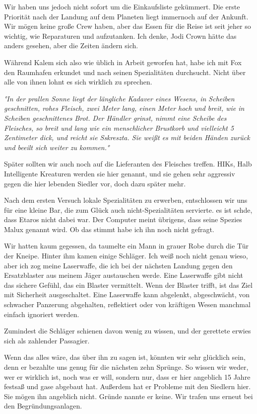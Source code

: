 \documentclass[11pt]{article}
\begin{document}
Wir haben uns jedoch nicht sofort um die Einkaufsliste gekümmert. Die
erste Priorität nach der Landung auf dem Planeten liegt immernoch auf
der Ankunft. Wir mögen keine große Crew haben, aber das Essen für die
Reise ist seit jeher so wichtig, wie Reparaturen und aufzutanken. Ich
denke, Jodi Crown hätte das anders gesehen, aber die Zeiten ändern sich.

Während Kalem sich also wie üblich in Arbeit geworfen hat, habe ich mit
Fox den Raumhafen erkundet und nach seinen Spezialitäten durchsucht.
Nicht über alle von ihnen lohnt es sich wirklich zu sprechen.

\emph{°In der prallen Sonne liegt der längliche Kadaver eines Wesens, in
Scheiben geschnitten, rohes Fleisch, zwei Meter lang, einen Meter hoch
und breit, wie in Scheiben geschnittenes Brot. Der Händler grinst, nimmt
eine Scheibe des Fleisches, so breit und lang wie ein menschlicher
Brustkorb und vielleicht 5 Zentimeter dick, und reicht sie Sskreszta.
Sie weißt es mit beiden Händen zurück und beeilt sich weiter zu
kommen.°}

Später sollten wir auch noch auf die Lieferanten des Fleisches treffen.
HIKs, Halb Intelligente Kreaturen werden sie hier genannt, und sie gehen
sehr aggressiv gegen die hier lebenden Siedler vor, doch dazu später
mehr.

Nach dem ersten Versuch lokale Spezialitäten zu erwerben, entschlossen
wir uns für eine kleine Bar, die zum Glück auch nicht-Spezialitäten
servierte. es ist schde, dass Etaros nicht dabei war. Der Computer meint
übrigens, dass seine Spezies Malux genannt wird. Ob das stimmt habe ich
ihn noch nicht gefragt.

Wir hatten kaum gegessen, da taumelte ein Mann in grauer Robe durch die
Tür der Kneipe. Hinter ihm kamen einige Schläger. Ich weiß noch nicht
genau wieso, aber ich zog meine Laserwaffe, die ich bei der nächsten
Landung gegen den Ersatzblaster aus meinem Jäger austauschen werde. Eine
Laserwaffe gibt nicht das sichere Gefühl, das ein Blaster vermittelt.
Wenn der Blaster trifft, ist das Ziel mit Sicherheit ausgeschaltet. Eine
Laserwaffe kann abgelenkt, abgeschwächt, von schwacher Panzerung
abgehalten, reflektiert oder von kräftigen Wesen manchmal einfach
ignoriert werden.

Zumindest die Schläger schienen davon wenig zu wissen, und der gerettete
erwies sich als zahlender Passagier.

Wenn das alles wäre, das über ihn zu sagen ist, könnten wir sehr
glücklich sein, denn er bezahlte uns genug für die nächsten zehn
Sprünge. So wissen wir weder, wer er wirklich ist, noch was er will,
sondern nur, dass er hier angeblich 15 Jahre festsaß und gase abgebaut
hat. Außerdem hat er Probleme mit den Siedlern hier. Sie mögen ihn
angeblich nicht. Gründe nannte er keine. Wir trafen uns erneut bei den
Begründungsanlagen.
\end{document}
